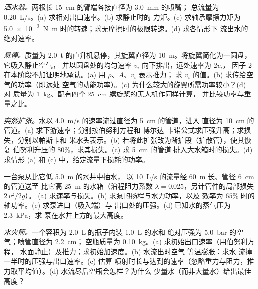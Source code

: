 \begin{exercise}[$\star\star$]\label{exo:b2:flow-balances:6}
\emph{洒水器。}两根长 \qty{15}{cm} 的臂端各接直径为 \qty{3.0}{mm} 的喷嘴；
总流量为 \qty{0.20}{L/s}。(a) 求相对出口速率。(b) 求静止时的
力矩。(c) 求轴承摩擦力矩为
\qty{5.0e-3}{N.m} 时的转速；求无摩擦时的极限转速。(d) 求各情形下
流出水的绝对速率。
\end{exercise}

\begin{exercise}[$\star\star$]\label{exo:b2:flow-balances:7}
\emph{悬停。}质量为 \qty{2.0}{t} 的直升机悬停，其旋翼直径为
\qty{10}{m}。将旋翼简化为一圆盘，它吸入静止空气，
并以圆盘处的均匀速率 $v_i$ 向下排出，远处速率为 $2v_i$，
因子 2 在本阶段不加证明地承认。(a) 用 $\rho$、$A$、$v_i$ 表示推力；
求 $v_i$ 的值。(b) 求传给空气的功率（即远处
空气的动能功率）。(c) 为什么较大的旋翼所需功率较小？(d) 对
质量为 \qty{1}{kg}、配有四个 \qty{25}{cm} 螺旋桨的无人机作同样计算，
并比较功率与重量之比。
\end{exercise}

\begin{exercise}[$\star\star$]\label{exo:b2:flow-balances:8}
\emph{突然扩张。}水以 \qty{4.0}{m/s} 的速率流过直径为 \qty{5}{cm} 的管道，进入
直径为 \qty{10}{cm} 的管道。(a) 求下游速率；分别按伯努利方程和
博尔达–卡诺公式求压强升高；求损失，分别以帕斯卡和
米水头表示。(b) 若将此扩张改为渐扩段（扩散管），使其恢复
伯努利升压的 $80\%$，求其损失。(c) 求 \qty{5}{cm} 的管道
排入大水箱时的损失。(d) 求情形 (a) 和 (c) 中，给定流量下损耗的功率。
\end{exercise}

\begin{exercise}[$\star\star$]\label{exo:b2:flow-balances:9}
一台泵从比它低 \qty{5.0}{m} 的水井中抽水，
以 \qty{10}{L/s} 的流量经 \qty{60}{m} 长、管径 \qty{6}{cm} 的管道送至
比它高 \qty{25}{m} 的水箱（沿程阻力系数 $\lambda = 0.025$，另计管件的局部损失 $2\,v^2/2g$）。
(a) 求速率与损失。(b) 求泵的扬程与水力功率，以及
效率为 $65\%$ 时的轴功率。(c) 求泵进口（吸入端）与
出口处的压强。(d) 已知水的蒸气压为 \qty{2.3}{kPa}，求
泵在水井上方的最大高度。
\end{exercise}

\begin{exercise}[$\star\star\star$]\label{exo:b2:flow-balances:10}
\emph{水火箭。}一个容积为 \qty{2.0}{L} 的瓶子内装 \qty{1.0}{L} 的水和
绝对压强为 \qty{5.0}{bar} 的空气；喷管直径为 \qty{2.2}{cm}；
空瓶质量为 \qty{0.10}{kg}。(a) 求初始出口速率（用伯努利方程，
水面静止）及推力；求初始加速度。(b) 水流出时空气
等温膨胀：求水
流掉一半时的压强与出口速率。(c) 估算
喷射时长与达到的速率（忽略重力与阻力，推力取平均值）。(d)
水流尽后空瓶会怎样？为什么
少量水（而非大量水）给出最佳高度？
\end{exercise}

